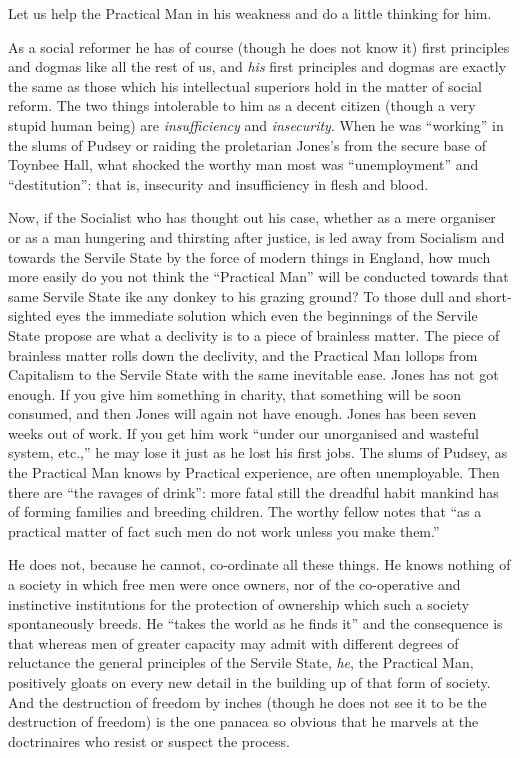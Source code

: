 \documentclass{book}
\begin{document}
Let us help the Practical Man in his weakness and do a little thinking for him.

As a social reformer he has of course (though he does not know it) first principles and dogmas like all the rest of us, and \emph{his} first principles and dogmas are exactly the same as those which his intellectual superiors hold in the matter of social reform. The two things intolerable to him as a decent citizen (though a very stupid human being) are \emph{insufficiency} and \emph{insecurity}. When he was “working” in the slums of Pudsey or raiding the proletarian Jones’s from the secure base of Toynbee Hall, what shocked the worthy man most was “unemployment” and “destitution”: that is, insecurity and insufficiency in flesh and blood.

Now, if the Socialist who has thought out his case, whether as a mere organiser or as a man hungering and thirsting after justice, is led away from Socialism and towards the Servile State by the force of modern things in England, how much more easily do you not think the “Practical Man” will be conducted towards that same Servile State ike any donkey to his grazing ground? To those dull and short-sighted eyes the immediate solution which even the beginnings of the Servile State propose are what a declivity is to a piece of brainless matter. The piece of brainless matter rolls down the declivity, and the Practical Man lollops from Capitalism to the Servile State with the same inevitable ease. Jones has not got enough. If you give him something in charity, that something will be soon consumed, and then Jones will again not have enough. Jones has been seven weeks out of work. If you get him work “under our unorganised and wasteful system, etc.,” he may lose it just as he lost his first jobs. The slums of Pudsey, as the Practical Man knows by Practical experience, are often unemployable. Then there are “the ravages of drink”: more fatal still the dreadful habit mankind has of forming families and breeding children. The worthy fellow notes that “as a practical matter of fact such men do not work unless you make them.”

He does not, because he cannot, co-ordinate all these things. He knows nothing of a society in which free men were once owners, nor of the co-operative and instinctive institutions for the protection of ownership which such a society spontaneously breeds. He “takes the world as he finds it” and the consequence is that whereas men of greater capacity may admit with different degrees of reluctance the general principles of the Servile State, \emph{he}, the Practical Man, positively gloats on every new detail in the building up of that form of society. And the destruction of freedom by inches (though he does not see it to be the destruction of freedom) is the one panacea so obvious that he marvels at the doctrinaires who resist or suspect the process.
\end{document}
